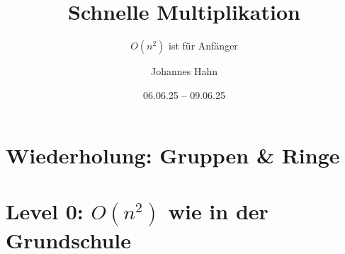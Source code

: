 \documentclass[fontsize=11pt,fleqn,a4paper]{scrartcl}
\author{Johannes Hahn}
\title{Schnelle Multiplikation}
\subtitle{$O(n^2)$ ist für Anfänger}
\date{06.06.25 -- 09.06.25}
\begin{document}
\maketitle

\tableofcontents
\pagebreak

\setcounter{section}{-1}
\section{Wiederholung: Gruppen \& Ringe}\label{algebra}



\section{Level 0: $O(n^2)$ wie in der Grundschule}\label{slow_multiplication}

\end{document}
